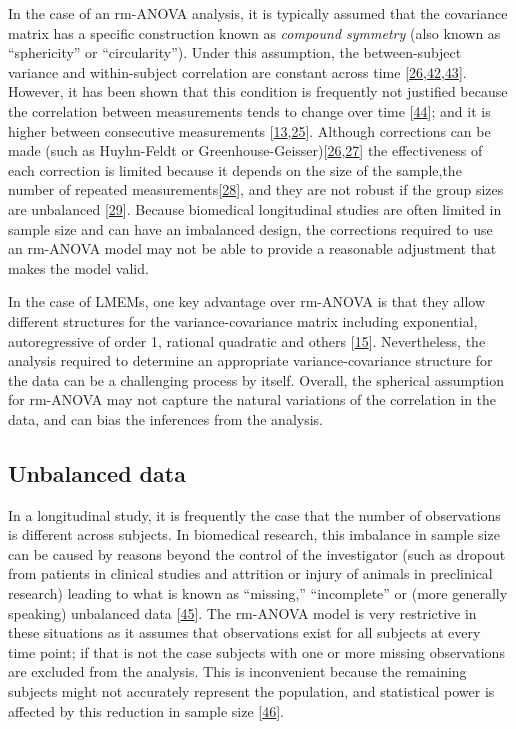 \documentclass[
]{article}
\begin{document}
In the case of an rm-ANOVA analysis, it is typically assumed that the covariance matrix has a specific construction known as \emph{compound symmetry} (also known as ``sphericity'' or ``circularity''). Under this assumption, the between-subject variance and within-subject correlation are constant across time {[}\protect\hyperlink{ref-huynh1976}{26},\protect\hyperlink{ref-weiss2005}{42},\protect\hyperlink{ref-geisser1958}{43}{]}. However, it has been shown that this condition is frequently not justified because the correlation between measurements tends to change over time {[}\protect\hyperlink{ref-maxwell2017}{44}{]}; and it is higher between consecutive measurements {[}\protect\hyperlink{ref-gueorguieva2004}{13},\protect\hyperlink{ref-ugrinowitsch2004}{25}{]}. Although corrections can be made (such as Huyhn-Feldt or Greenhouse-Geisser){[}\protect\hyperlink{ref-huynh1976}{26},\protect\hyperlink{ref-greenhouse1959}{27}{]} the effectiveness of each correction is limited because it depends on the size of the sample,the number of repeated measurements{[}\protect\hyperlink{ref-haverkamp2017}{28}{]}, and they are not robust if the group sizes are unbalanced {[}\protect\hyperlink{ref-keselman2001}{29}{]}. Because biomedical longitudinal studies are often limited in sample size and can have an imbalanced design, the corrections required to use an rm-ANOVA model may not be able to provide a reasonable adjustment that makes the model valid.

In the case of LMEMs, one key advantage over rm-ANOVA is that they allow different structures for the variance-covariance matrix including exponential, autoregressive of order 1, rational quadratic and others {[}\protect\hyperlink{ref-pinheiro2006}{15}{]}. Nevertheless, the analysis required to determine an appropriate variance-covariance structure for the data can be a challenging process by itself. Overall, the spherical assumption for rm-ANOVA may not capture the natural variations of the correlation in the data, and can bias the inferences from the analysis.

\hypertarget{unbalanced-data}{%
\subsection{Unbalanced data}\label{unbalanced-data}}

In a longitudinal study, it is frequently the case that the number of observations is different across subjects. In biomedical research, this imbalance in sample size can be caused by reasons beyond the control of the investigator (such as dropout from patients in clinical studies and attrition or injury of animals in preclinical research) leading to what is known as ``missing,'' ``incomplete'' or (more generally speaking) unbalanced data {[}\protect\hyperlink{ref-molenberghs2004}{45}{]}. The rm-ANOVA model is very restrictive in these situations as it assumes that observations exist for all subjects at every time point; if that is not the case subjects with one or more missing observations are excluded from the analysis. This is inconvenient because the remaining subjects might not accurately represent the population, and statistical power is affected by this reduction in sample size {[}\protect\hyperlink{ref-ma2012}{46}{]}.
\end{document}
